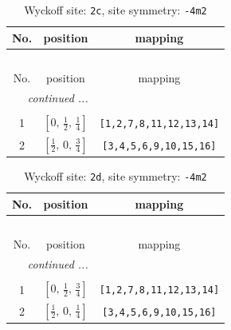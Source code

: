 \documentclass[fleqn,8pt]{jsarticle}
\begin{document}
\renewcommand{\arraystretch}{1.2}
\begin{longtable}{ccc}
\caption{Wyckoff site: {\tt 2c}, site symmetry: {\tt -4m2}}
 \\
 \hline \hline
No. & position & mapping \\ \hline \endfirsthead

\multicolumn{2}{l}{\tablename\ \thetable{}} \\
 \hline \hline
No. & position & mapping \\ \hline \endhead

 \hline \hline
\multicolumn{2}{r}{\footnotesize\it continued ...} \\ \endfoot

 \hline \hline
\multicolumn{2}{r}{} \\ \endlastfoot

1 & $\left[ 0,\, \frac{1}{2},\, \frac{1}{4} \right]$ & {\tt [1,2,7,8,11,12,13,14]} \\ \hline
2 & $\left[ \frac{1}{2},\, 0,\, \frac{3}{4} \right]$ & {\tt [3,4,5,6,9,10,15,16]} \\
\end{longtable}
\renewcommand{\arraystretch}{1.2}
\begin{longtable}{ccc}
\caption{Wyckoff site: {\tt 2d}, site symmetry: {\tt -4m2}}
 \\
 \hline \hline
No. & position & mapping \\ \hline \endfirsthead

\multicolumn{2}{l}{\tablename\ \thetable{}} \\
 \hline \hline
No. & position & mapping \\ \hline \endhead

 \hline \hline
\multicolumn{2}{r}{\footnotesize\it continued ...} \\ \endfoot

 \hline \hline
\multicolumn{2}{r}{} \\ \endlastfoot

1 & $\left[ 0,\, \frac{1}{2},\, \frac{3}{4} \right]$ & {\tt [1,2,7,8,11,12,13,14]} \\ \hline
2 & $\left[ \frac{1}{2},\, 0,\, \frac{1}{4} \right]$ & {\tt [3,4,5,6,9,10,15,16]} \\
\end{longtable}
\renewcommand{\arraystretch}{1.2}
\end{document}
